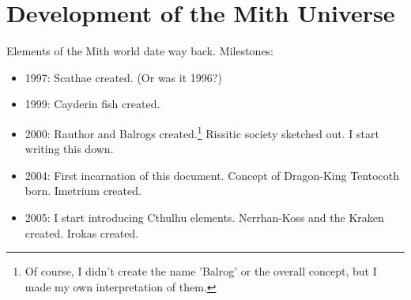 \chapter{Development of the Mith Universe}
Elements of the Mith world date way back. Milestones:

\begin{itemize}
\item{1997:} Scathae created. (Or was it 1996?)
\item{1999:} Cayderin fish created. 
\item{2000:} Rauthor and Balrogs created.\footnote{Of course, I didn't create the name 'Balrog' or the overall concept, but I made my own interpretation of them.} Rissitic society sketched out. I start writing this down. 
\item{2004:} First incarnation of this document. Concept of Dragon-King Tentocoth born. Imetrium created. 
\item{2005:} I start introducing Cthulhu elements. Nerrhan-Koss and the Kraken created. Irokas created. 
\end{itemize}




